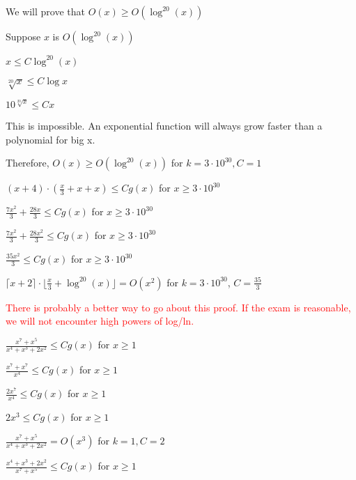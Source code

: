 \documentclass{exam}
\begin{document}
\begin{questions}
\begin{subparts}
\begin{center}
We will prove that \(O(x) \geq O(\log^{20}(x))\)

Suppose \(x\) is \(O(\log^{20}(x))\)

\(x \leq C\log^{20}(x)\)

\(\sqrt[20]{x} \leq C\log{x}\)

\(10^{\sqrt[20]{x}} \leq Cx\)

This is impossible. An exponential function will always grow faster than a polynomial for big x.

Therefore, \(O(x) \geq O(\log^{20}(x))\) for \(k = 3 \cdot 10^{30}, C = 1\)

\( (x + 4) \cdot (\frac{x}{3} + x + x) \leq Cg(x)\) for \(x \geq 3 \cdot 10^{30}\)

\( \frac{7x^2}{3} + \frac{28x}{3} \leq Cg(x)\) for \(x \geq 3 \cdot 10^{30}\)

\( \frac{7x^2}{3} + \frac{28x^2}{3} \leq Cg(x)\) for \(x \geq 3 \cdot 10^{30}\)

\( \frac{35x^2}{3} \leq Cg(x)\) for \(x \geq 3 \cdot 10^{30}\)

\( \lceil x + 2 \rceil \cdot \lfloor \frac{x}{3} + \log^{20}(x) \rfloor = O(x^2)\) for \(k = 3\cdot10^{30}\), \(C = \frac{35}{3}\)

\textcolor{red}{There is probably a better way to go about this proof. If the exam is reasonable, we will not encounter high powers of log/ln.}

\end{center}


\begin{center}

\( \frac{x^7 + x^5}{x^4 + x^3 + 2x^2} \leq Cg(x)\) for \(x \geq 1\)

\( \frac{x^7 + x^7}{x^4} \leq Cg(x)\) for \(x \geq 1\)

\( \frac{2x^7}{x^4} \leq Cg(x)\) for \(x \geq 1\)

\( 2x^3 \leq Cg(x)\) for \(x \geq 1\)

\( \frac{x^7 + x^5}{x^4 + x^3 + 2x^2} = O(x^3)\) for \(k = 1, C = 2\)

\end{center}


\begin{center}

\( \frac{x^4 + x^3 + 2x^2}{x^7 + x^5} \leq Cg(x)\) for \(x \geq 1\)


\end{center}
\end{subparts}
\end{questions}
\end{document}
